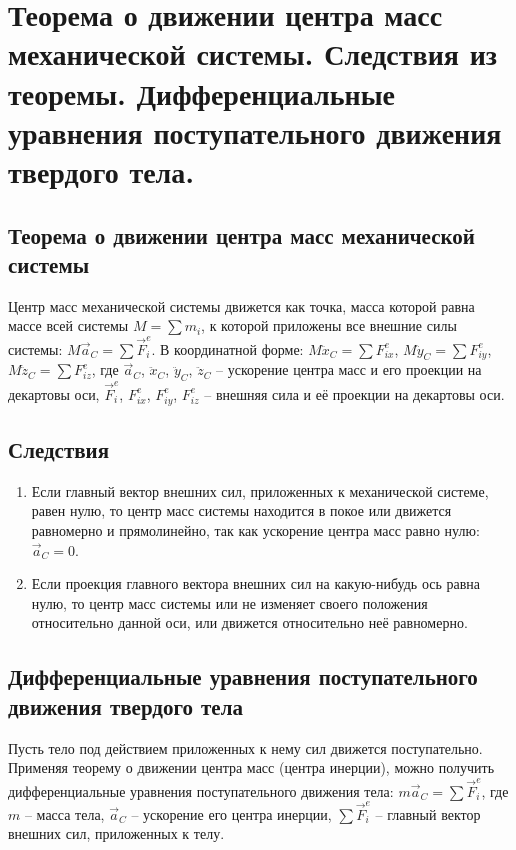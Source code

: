 \chapter{Теорема о движении центра масс механической системы. Следствия из
теоремы. Дифференциальные уравнения поступательного движения твердого
тела.}

\section{Теорема о движении центра масс механической системы}
Центр масс механической системы движется как точка, масса которой равна массе
всей системы \( M = \sum m_i \), к которой приложены все внешние силы системы:
\( M\vec{a}_C = \sum \vec{F}^e_i \). В координатной форме:
\( M\ddot{x}_C = \sum F^e_{ix} \), \( M\ddot{y}_C = \sum F^e_{iy} \),
\( M\ddot{z}_C = \sum F^e_{iz} \), где \( \vec{a}_C \), \( \ddot{x}_C \),
\( \ddot{y}_C \), \( \ddot{z}_C \) -- ускорение центра масс и его проекции на
декартовы оси, \( \vec{F}^e_i \), \( F^e_{ix} \), \( F^e_{iy} \), \( F^e_{iz} \)
-- внешняя сила и её проекции на декартовы оси.

\section{Следствия}
\begin{enumerate}
    \item Если главный вектор внешних сил, приложенных к механической системе,
    равен нулю, то центр масс системы находится в покое или движется равномерно
    и прямолинейно, так как ускорение центра масс равно нулю:
    \( \vec{a}_C = 0 \).
    
    \item Если проекция главного вектора внешних сил на какую-нибудь ось равна
    нулю, то центр масс системы или не изменяет своего положения относительно
    данной оси, или движется относительно неё равномерно.
\end{enumerate}

\section{Дифференциальные уравнения поступательного движения твердого тела}

Пусть тело под действием приложенных к нему сил движется поступательно. Применяя
теорему о движении центра масс (центра инерции), можно получить дифференциальные
уравнения поступательного движения тела: \( m\vec{a}_C = \sum \vec{F}^e_i \), где
\( m \) -- масса тела, \( \vec{a}_C \) -- ускорение его центра инерции,
\( \sum \vec{F}^e_i \) -- главный вектор внешних сил, приложенных к телу.

